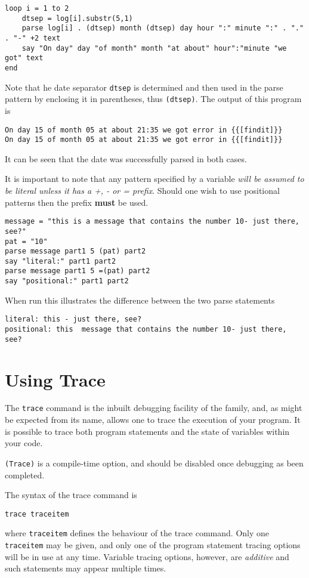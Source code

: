 {\begin{lstlisting}[label=variablePattern, caption=Variables in Patterns]
loop i = 1 to 2
	dtsep = log[i].substr(5,1)
	parse log[i] . (dtsep) month (dtsep) day hour ":" minute ":" . "." . "-" +2 text
	say "On day" day "of month" month "at about" hour":"minute "we got" text
end
\end{lstlisting}
Note that he date separator \texttt{dtsep} is determined and then used in the parse pattern by enclosing it in parentheses, thus \texttt{(dtsep)}. The output of this program is
\begin{verbatim}
On day 15 of month 05 at about 21:35 we got error in {{[findit]}} 
On day 15 of month 05 at about 21:35 we got error in {{[findit]}} 
\end{verbatim}
It can be seen that the date was successfully parsed in both cases.

It is important to note that any pattern specified by a variable \textit{will be assumed to be literal unless it has a +, - or = prefix}. Should one wish to use positional patterns then the prefix \textbf{must} be used.
\begin{lstlisting}[label=variablePosPattern, caption=Variables in Positional Patterns]
message = "this is a message that contains the number 10- just there, see?"
pat = "10"
parse message part1 5 (pat) part2
say "literal:" part1 part2
parse message part1 5 =(pat) part2
say "positional:" part1 part2
\end{lstlisting}
When run this illustrates the difference between the two parse statements
\begin{verbatim}
literal: this - just there, see? 
positional: this  message that contains the number 10- just there, see?
\end{verbatim}
\chapter{Using Trace}
The \texttt{trace} command is the inbuilt debugging facility of the \Rexx{} family, and, as might be expected from its name, allows one to trace the execution of your program. It is possible to trace both program statements and the state of variables within your code.

\texttt{(Trace)} is a compile-time option, and should be disabled once debugging as been completed.

The syntax of the trace command is
\begin{verbatim}
trace traceitem 
\end{verbatim}
where \texttt{traceitem} defines the behaviour of the trace command. Only one \texttt{traceitem} may be given, and only one of the program statement tracing options will be in use at any time. 
Variable tracing options, however, are \textit{additive} and such statements may appear multiple times.

}

